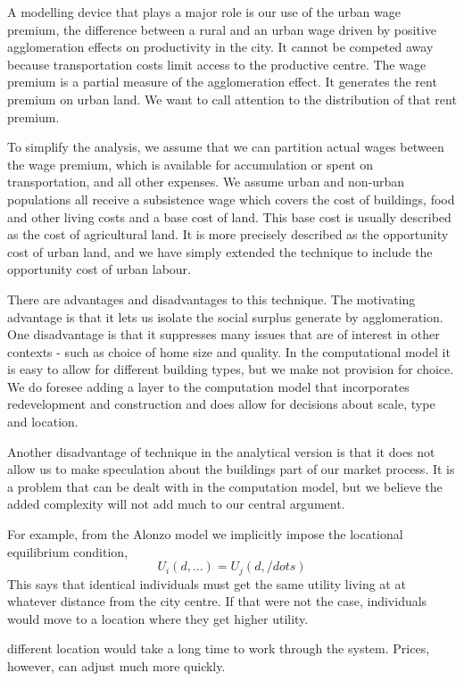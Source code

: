 A modelling device that plays a major role is our use of the \gls{urban wage premium}, the difference between a rural and an urban wage driven by positive agglomeration effects on productivity in the city. It cannot be competed away because transportation costs limit access to the productive centre. The wage premium is a partial measure of the agglomeration effect. It generates the rent premium on urban land. We want to call attention to the distribution of that rent premium.

To simplify the analysis, we assume that we can partition actual wages between the wage premium, which is available for accumulation or spent on transportation, and all other expenses. We assume urban and non-urban populations all receive a subsistence wage which covers  the cost of buildings, food and other living costs and a base cost of land. This base cost is usually described as the cost of agricultural land. It is more precisely described as the opportunity cost of urban land, and we have simply extended the technique to include the opportunity cost of urban labour. 

There are advantages and disadvantages to this technique. The motivating advantage is that it lets us isolate the social surplus generate by agglomeration. One disadvantage is that it suppresses many issues that are of interest in other contexts - such as choice of home size and quality. In the computational model it is easy to allow for different building types, but we make not provision for choice. We do foresee adding a layer to the computation  model that incorporates redevelopment and construction and does allow for decisions about scale, type and location. 

Another disadvantage of technique in the analytical version is that it does not allow us to make speculation about the buildings part of our market process. It is a problem that can be dealt with in the computation model, but we believe the added complexity will not add much to our central argument.


For example, from the Alonzo model we implicitly impose the locational equilibrium condition,
\[U_i(d,\dots)=U_j(d, /dots)\]
This says that identical individuals must get the same utility living at at whatever distance from the city centre. If that were not the case, individuals would move to a location where they get higher utility.

different location would take a long time to work through the system. Prices, however, can adjust much more quickly. 

